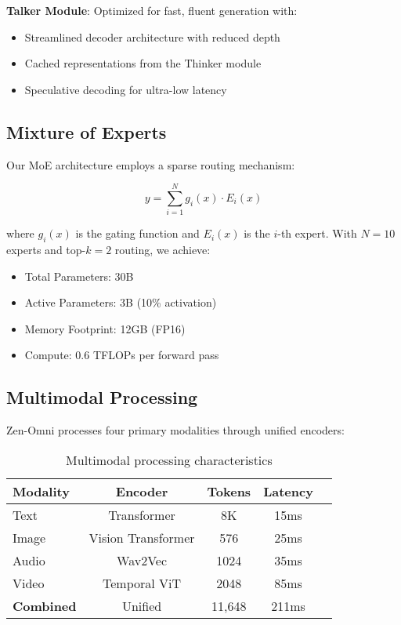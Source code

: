 \documentclass{article}
\begin{document}
\textbf{Talker Module}: Optimized for fast, fluent generation with:
\begin{itemize}
    \item Streamlined decoder architecture with reduced depth
    \item Cached representations from the Thinker module
    \item Speculative decoding for ultra-low latency
\end{itemize}

\subsection{Mixture of Experts}

Our MoE architecture employs a sparse routing mechanism:

\begin{equation}
    y = \sum_{i=1}^{N} g_i(x) \cdot E_i(x)
\end{equation}

where $g_i(x)$ is the gating function and $E_i(x)$ is the $i$-th expert. With $N=10$ experts and top-$k=2$ routing, we achieve:

\begin{itemize}
    \item Total Parameters: 30B
    \item Active Parameters: 3B (10\% activation)
    \item Memory Footprint: 12GB (FP16)
    \item Compute: 0.6 TFLOPs per forward pass
\end{itemize}

\subsection{Multimodal Processing}

Zen-Omni processes four primary modalities through unified encoders:

\begin{table}[h]
\centering
\begin{tabular}{lcccc}
\toprule
\textbf{Modality} & \textbf{Encoder} & \textbf{Tokens} & \textbf{Latency} \\
\midrule
Text & Transformer & 8K & 15ms \\
Image & Vision Transformer & 576 & 25ms \\
Audio & Wav2Vec & 1024 & 35ms \\
Video & Temporal ViT & 2048 & 85ms \\
\midrule
\textbf{Combined} & Unified & 11,648 & 211ms \\
\bottomrule
\end{tabular}
\caption{Multimodal processing characteristics}
\end{table}
\end{document}
